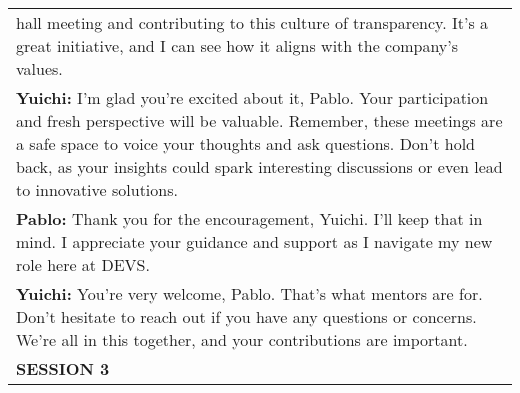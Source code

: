 \begin{xltabular}{0.9\linewidth}{X}
hall meeting and contributing to this culture of transparency. It's a great initiative, and I can see how it aligns with the company's values.\\ \textbf{Yuichi:} I'm glad you're excited about it, Pablo. Your participation and fresh perspective will be valuable. Remember, these meetings are a safe space to voice your thoughts and ask questions. Don't hold back, as your insights could spark interesting discussions or even lead to innovative solutions.\\ \textbf{Pablo:} Thank you for the encouragement, Yuichi. I'll keep that in mind. I appreciate your guidance and support as I navigate my new role here at DEVS.\\ \textbf{Yuichi:} You're very welcome, Pablo. That's what mentors are for. Don't hesitate to reach out if you have any questions or concerns. We're all in this together, and your contributions are important. \\
\midrule
\textbf{SESSION 3} \\
\midrule


\end{xltabular}
